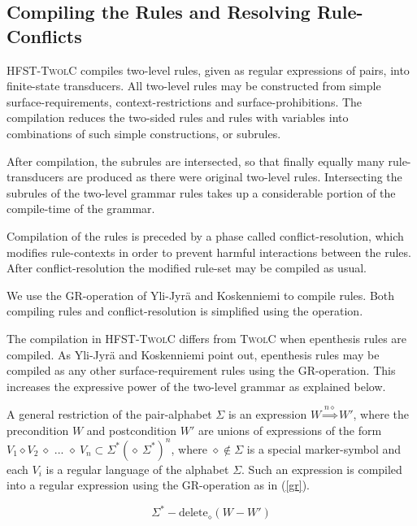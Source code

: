 \documentclass[a4paper]{article}
\begin{document}
\subsection{Compiling the Rules and Resolving Rule-Conflicts}

\textsc{HFST-TwolC} compiles two-level rules, given as regular
expressions of pairs, into finite-state transducers. All two-level
rules may be constructed from simple surface-requirements,
context-restrictions and surface-prohibitions. The compilation reduces
the two-sided rules and rules with variables into combinations of such
simple constructions, or subrules.

After compilation, the subrules are intersected, so that finally
equally many rule-transducers are produced as there were original
two-level rules. Intersecting the subrules of the two-level grammar
rules takes up a considerable portion of the compile-time of the
grammar.

Compilation of the rules is preceded by a phase called
conflict-resolution, which modifies rule-contexts in order to prevent
harmful interactions between the rules. After conflict-resolution the
modified rule-set may be compiled as usual.

We use the GR-operation of Yli-Jyr\"a and Koskenniemi
\cite{Yli-Jyra06} to compile rules. Both compiling rules and
conflict-resolution is simplified using the operation.

The compilation in \textsc{HFST-TwolC} differs from \textsc{TwolC}
when epenthesis rules are compiled. As Yli-Jyr\"a and Koskenniemi
\cite{Yli-Jyra06} point out, epenthesis rules may be compiled as any
other surface-requirement rules using the GR-operation. This increases
the expressive power of the two-level grammar as explained below.

A general restriction of the pair-alphabet $\Sigma$ is an expression
$W \overset{n\diamond}{\Rightarrow}W'$, where the precondition $W$ and
postcondition $W'$ are unions of expressions of the form $V_1 \diamond
V_2\ \diamond \text{ ... }\diamond\ V_n \subset \Sigma^* (\diamond\
\Sigma^*)^n$, where $\diamond \notin \Sigma$ is a special
marker-symbol and each $V_i$ is a regular language of the alphabet
$\Sigma$. Such an expression is compiled into a regular expression
using the GR-operation as in (\ref{gr}).

\begin{equation}
  \label{gr}
  \Sigma^* - \text{delete}_{\diamond}(W - W')
\end{equation}
\end{document}
